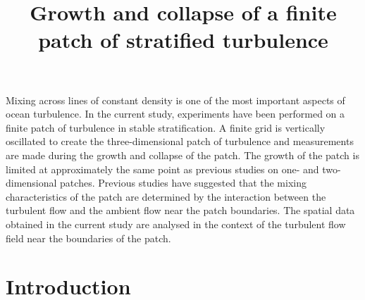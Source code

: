 \documentclass[10pt,a4paper]{article}
\begin{document}
\title{Growth and collapse of a finite patch of stratified turbulence}


\maketitle
\newcommand{\unit}[1]{\ensuremath{\, \mathrm{\hspace{0.5mm}#1}}}

\begin{summary}
Mixing across lines of constant density is one of the most important aspects of ocean turbulence.  In the current study, experiments have been performed on a finite patch of turbulence in stable stratification.  A finite grid is vertically oscillated to create the three-dimensional patch of turbulence and measurements are made during the growth and collapse of the patch.  The growth of the patch is limited at approximately the same point as previous studies on one- and two-dimensional patches.  Previous studies have suggested that the mixing characteristics of the patch are determined by the interaction between the turbulent flow and the ambient flow near the patch boundaries.  The spatial data obtained in the current study are analysed in the context of the turbulent flow field near the boundaries of the patch.    
\end{summary}

\section{Introduction}
\end{document}
